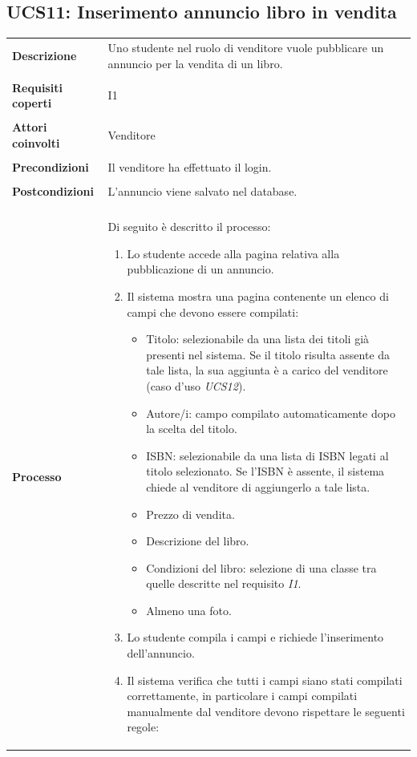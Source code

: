 \documentclass[10pt,a4paper]{report}
\begin{document}
	\subsection{UCS11: Inserimento annuncio libro in vendita}
	\begin{tabular}{lp{}}
		\textbf{Descrizione}&Uno studente nel ruolo di venditore vuole pubblicare un annuncio per la vendita di un libro.\\
		\\
		\textbf{Requisiti coperti}&I1\\
		\\
		\textbf{Attori coinvolti}&Venditore\\
		\\
		\textbf{Precondizioni}&Il venditore ha effettuato il login.\\
		\\
		\textbf{Postcondizioni}&L'annuncio viene salvato nel database.\\
		\\
		\textbf{Processo}&Di seguito è descritto il processo:
		\begin{enumerate}
			\item Lo studente accede alla pagina relativa alla pubblicazione di un annuncio.
			\item Il sistema mostra una pagina contenente un elenco di campi che devono essere compilati:
			\begin{itemize}
				\item Titolo: selezionabile da una lista dei titoli già presenti nel sistema. Se il titolo risulta assente da tale lista, la sua aggiunta è a carico del venditore (caso d'uso \textit{UCS12}).
				\item Autore/i: campo compilato automaticamente dopo la scelta del titolo.
				\item ISBN: selezionabile da una lista di ISBN legati al titolo selezionato. Se l'ISBN è assente, il sistema chiede al venditore di aggiungerlo a tale lista.
				\item Prezzo di vendita.
				\item Descrizione del libro.
				\item Condizioni del libro: selezione di una classe tra quelle descritte nel requisito \textit{I1}.
				\item Almeno una foto.
			\end{itemize}
			\item Lo studente compila i campi e richiede l'inserimento dell'annuncio.
			\item Il sistema verifica che tutti i campi siano stati compilati correttamente, in particolare i campi compilati manualmente dal venditore devono rispettare le seguenti regole:

\end{enumerate}
\end{tabular}
\end{document}
